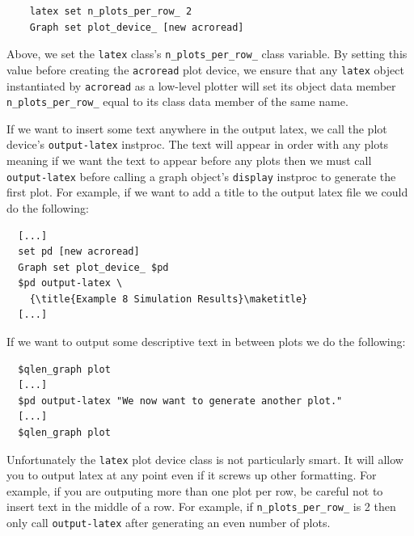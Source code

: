 \documentclass[11pt]{article}
\begin{document}
  \begin{verbatim}
    latex set n_plots_per_row_ 2
    Graph set plot_device_ [new acroread]
  \end{verbatim}

Above, we set the \verb|latex| class's \verb|n_plots_per_row_| class
variable.  By setting this value before creating the \verb|acroread|
plot device, we ensure that any \verb|latex| object instantiated by
\verb|acroread| as a low-level plotter will set its object data member
\verb|n_plots_per_row_| equal to its class data member of the same
name.

If we want to insert some text anywhere in the output latex, we call
the plot device's \verb|output-latex| instproc.  The text
will appear in order with any plots meaning if we want the text to
appear before any plots then we must call \verb|output-latex| before
calling a graph object's \verb|display| instproc to generate the first
plot.  For example, if we want to add a title to the output latex
file we could do the following:

\begin{verbatim}
  [...]
  set pd [new acroread]
  Graph set plot_device_ $pd
  $pd output-latex \
    {\title{Example 8 Simulation Results}\maketitle}
  [...]
\end{verbatim}

If we want to output some descriptive text in between plots 
we do the following:

\begin{verbatim}
  $qlen_graph plot
  [...]
  $pd output-latex "We now want to generate another plot."
  [...]
  $qlen_graph plot
\end{verbatim}

Unfortunately the \verb|latex| plot device class is not particularly
smart.  It will allow you to output latex at any point even if it
screws up other formatting.  For example, if you are outputing more
than one plot per row, be careful not to insert text in the middle of
a row.  For example, if \verb|n_plots_per_row_| is 2 then only call
\verb|output-latex| after generating an even number of plots.
\end{document}

